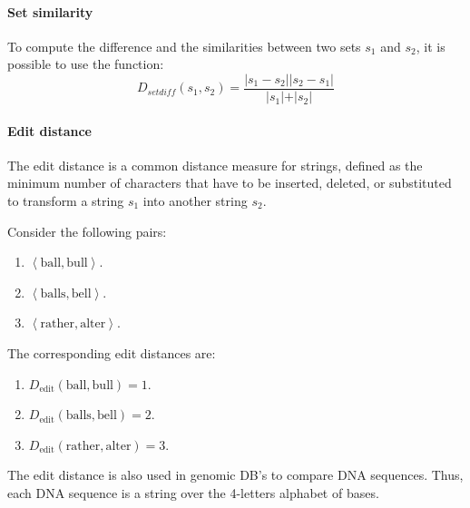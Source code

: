 \paragraph*{Set similarity}
To compute the difference and the similarities between two sets $s_1$ and $s_2$, it is possible to use the function: 
\[D_{setdiff}(s_1,s_2)=\dfrac{\left\lvert s_1 - s_2 \right\rvert \left\lvert s_2 - s_1 \right\rvert }{\left\lvert s_1 \left\lvert +\right\rvert s_2 \right\rvert}\]

\paragraph*{Edit distance}
The edit distance is a common distance measure for strings, defined as the minimum number of characters that have to be inserted, deleted, or substituted to transform a string $s_1$ into another string $s_2$. 
\begin{example}
    Consider the following pairs: 
    \begin{enumerate}
        \item $\left\langle \text{ball},\text{bull} \right\rangle$.
        \item $\left\langle \text{balls},\text{bell} \right\rangle$.
        \item $\left\langle \text{rather},\text{alter} \right\rangle$.
    \end{enumerate}
    The corresponding edit distances are: 
    \begin{enumerate}
        \item $D_{\text{edit}}(\text{ball},\text{bull})=1$.
        \item $D_{\text{edit}}(\text{balls},\text{bell})=2$.
        \item $D_{\text{edit}}(\text{rather},\text{alter})=3$.
    \end{enumerate}
\end{example}
The edit distance is also used in genomic DB's to compare DNA sequences.
Thus, each DNA sequence is a string over the 4-letters alphabet of bases. 
